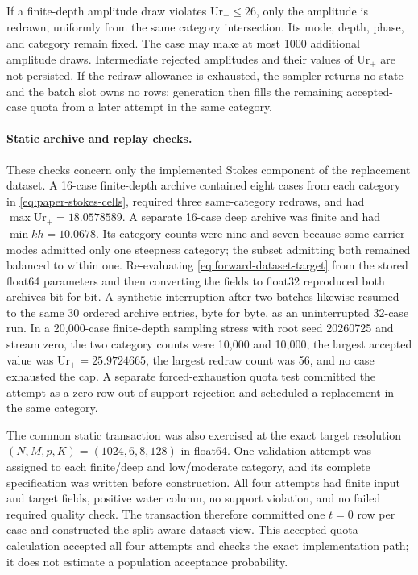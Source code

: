 If a finite-depth amplitude draw violates
$\mathrm{Ur}_+\leq26$, only the amplitude is redrawn, uniformly from the same
category intersection.  Its mode, depth, phase, and category remain fixed.  The case
may make at most 1000 additional amplitude draws.  Intermediate rejected
amplitudes and their values of $\mathrm{Ur}_+$ are not persisted.  If the
redraw allowance is exhausted, the sampler returns no state and the batch slot
owns no rows; generation then fills the remaining
accepted-case quota from a later attempt in the same category.

\paragraph{Static archive and replay checks.}
These checks concern only the implemented Stokes component of the replacement
dataset.  A 16-case finite-depth archive contained eight cases from each category
in \cref{eq:paper-stokes-cells}, required three same-category redraws, and had
$\max\mathrm{Ur}_+=18.0578589$.  A separate 16-case deep archive was finite
and had $\min kh=10.0678$.  Its category counts were nine and seven because some
carrier modes admitted only one steepness category; the subset admitting both remained
balanced to within one.  Re-evaluating
\cref{eq:forward-dataset-target} from the stored float64 parameters and then
converting the fields to float32 reproduced both archives bit for bit.  A
synthetic interruption after two batches likewise resumed to the same 30
ordered archive entries, byte for byte, as an uninterrupted 32-case run.  In
a 20,000-case finite-depth sampling stress with root seed 20260725 and stream
zero, the two category counts were 10,000 and 10,000, the largest accepted value
was $\mathrm{Ur}_+=25.9724665$, the largest redraw count was 56, and no case
exhausted the cap.  A separate forced-exhaustion quota test committed the
attempt as a zero-row out-of-support rejection and scheduled a
replacement in the same category.

The common static transaction was also exercised at the exact target
resolution $(N,M,p,K)=(1024,6,8,128)$ in float64.  One validation attempt was
assigned to each finite/deep and low/moderate category, and its complete
specification was written before construction.  All four attempts had finite
input and target fields, positive water column, no support violation, and no
failed required quality check.  The transaction therefore committed one
$t=0$ row per case and constructed the split-aware dataset view.  This
accepted-quota calculation accepted all four attempts and checks the exact
implementation path; it does not estimate a population acceptance
probability.

